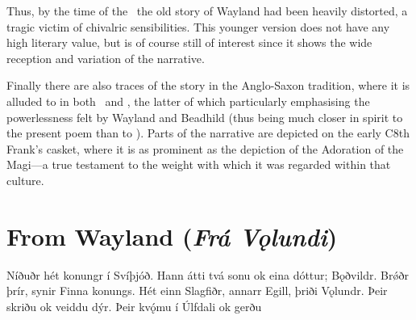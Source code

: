 Thus, by the time of the \ThidreksSaga\ the old story of Wayland had been heavily distorted, a tragic victim of chivalric sensibilities.  This younger version does not have any high literary value, but is of course still of interest since it shows the wide reception and variation of the narrative.

Finally there are also traces of the story in the Anglo-Saxon tradition, where it is alluded to in both \Waldere\ and \Deor, the latter of which particularly emphasising the powerlessness felt by Wayland and Beadhild (thus being much closer in spirit to the present poem than to \ThidreksSaga). Parts of the narrative are depicted on the early C8th Frank’s casket, where it is as prominent as the depiction of the Adoration of the Magi—a true testament to the weight with which it was regarded within that culture.

\section{From Wayland (\emph{Frá Vǫlundi})}

\bpg\bpa{}Níðuðr hét konungr í Svíþjóð.
Hann átti tvá sonu ok eina dóttur;  Bǫðvildr.
Brǿðr  þrír, synir Finna konungs. Hét einn Slagfiðr, annarr Egill, þriði Vǫlundr.
Þeir skriðu ok veiddu dýr. Þeir kvǫ́mu í Úlfdali ok gerðu \epa


